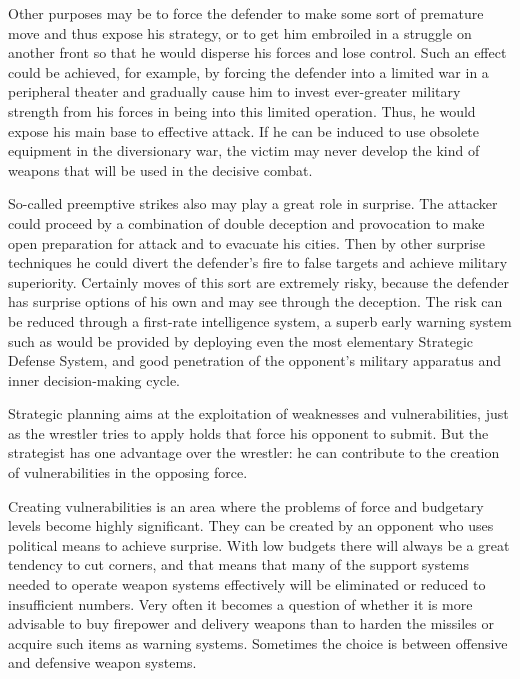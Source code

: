 Other purposes may be to force the defender to make some sort of premature move and thus expose his strategy, or to get him embroiled in a struggle on another front so that he would disperse his forces and lose control. Such an effect could be achieved, for example, by forcing the defender into a limited war in a peripheral theater and gradually cause him to invest ever-greater military strength from his forces in being into this limited operation. Thus, he would expose his main base to effective attack. If he can be induced to use obsolete equipment in the diversionary war, the victim may never develop the kind of weapons that will be used in the decisive combat.

So-called preemptive strikes also may play a great role in surprise. The attacker could proceed by a combination of double deception and provocation to make open preparation for attack and to evacuate his cities. Then by other surprise techniques he could divert the defender's fire to false targets and achieve military superiority. Certainly moves of this sort are extremely risky, because the defender has surprise options of his own and may see through the deception. The risk can be reduced through a first-rate intelligence system, a superb early warning system such as would be provided by deploying even the most elementary Strategic Defense System, and good penetration of the opponent's military apparatus and inner decision-making cycle.

Strategic planning aims at the exploitation of weaknesses and vulnerabilities, just as the wrestler tries to apply holds that force his opponent to submit. But the strategist has one advantage over the wrestler: he can contribute to the creation of vulnerabilities in the opposing force.

Creating vulnerabilities is an area where the problems of force and budgetary levels become highly significant. They can be created by an opponent who uses political means to achieve surprise. With low budgets there will always be a great tendency to cut corners, and that means that many of the support systems needed to operate weapon systems effectively will be eliminated or reduced to insufficient numbers. Very often it becomes a question of whether it is more advisable to buy firepower and delivery weapons than to harden the missiles or acquire such items as warning systems. Sometimes the choice is between offensive and defensive weapon systems.

